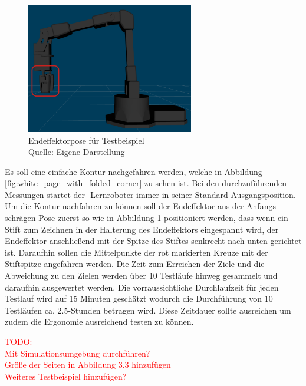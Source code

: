 \begin{figure}[htb]
	\centering
	\includegraphics[width=0.65\textwidth]{images/loesungsweg/endeffektor_pose_2}
	\caption[Endeffektorpose für Testbeispiel]{Endeffektorpose für Testbeispiel\\Quelle: Eigene Darstellung}
	\label{fig:endeffektor_pose}
\end{figure}
\FloatBarrier

Es soll eine einfache Kontur nachgefahren werden, welche in Abbildung \ref{fig:white_page_with_folded_corner} zu sehen ist. Bei den durchzuführenden Messungen startet der -Lernroboter immer in seiner Standard-Ausgangsposition. Um die Kontur nachfahren zu können soll der Endeffektor aus der Anfangs schrägen Pose zuerst so wie in Abbildung \ref{fig:endeffektor_pose} positioniert werden, dass wenn ein Stift zum Zeichnen in der Halterung des Endeffektors eingespannt wird, der Endeffektor anschließend mit der Spitze des Stiftes senkrecht nach unten gerichtet ist. Daraufhin sollen die Mittelpunkte der rot markierten Kreuze mit der Stiftspitze angefahren werden. Die Zeit zum Erreichen der Ziele und die Abweichung zu den Zielen werden über 10 Testläufe hinweg gesammelt und daraufhin ausgewertet werden. Die vorraussichtliche Durchlaufzeit für jeden Testlauf wird auf 15 Minuten geschätzt wodurch die Durchführung von 10 Testläufen ca. \num{2,5}-Stunden betragen wird. Diese Zeitdauer sollte ausreichen um zudem die Ergonomie ausreichend testen zu können.


\textcolor{red}{TODO:\\
Mit Simulationsumgebung durchführen?\\
Größe der Seiten in Abbildung 3.3 hinzufügen\\
Weiteres Testbeispiel hinzufügen?
}
